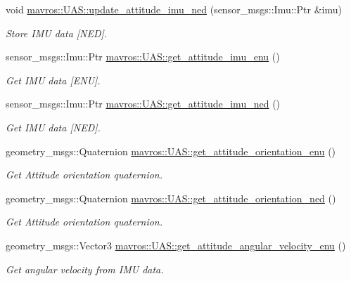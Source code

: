 \begin{DoxyCompactItemize}
void \mbox{\hyperlink{group__nodelib_gacd6fc1ac631a90619d7f53fa5ab9b29d}{mavros\+::\+U\+A\+S\+::update\+\_\+attitude\+\_\+imu\+\_\+ned}} (sensor\+\_\+msgs\+::\+Imu\+::\+Ptr \&imu)
\begin{DoxyCompactList}\small\item\em Store I\+MU data \mbox{[}N\+ED\mbox{]}. \end{DoxyCompactList}\item 
sensor\+\_\+msgs\+::\+Imu\+::\+Ptr \mbox{\hyperlink{group__nodelib_ga191709b6e50268022d10e469a3897975}{mavros\+::\+U\+A\+S\+::get\+\_\+attitude\+\_\+imu\+\_\+enu}} ()
\begin{DoxyCompactList}\small\item\em Get I\+MU data \mbox{[}E\+NU\mbox{]}. \end{DoxyCompactList}\item 
sensor\+\_\+msgs\+::\+Imu\+::\+Ptr \mbox{\hyperlink{group__nodelib_ga31440655ed2c55b927fb6e3ed66a41a1}{mavros\+::\+U\+A\+S\+::get\+\_\+attitude\+\_\+imu\+\_\+ned}} ()
\begin{DoxyCompactList}\small\item\em Get I\+MU data \mbox{[}N\+ED\mbox{]}. \end{DoxyCompactList}\item 
geometry\+\_\+msgs\+::\+Quaternion \mbox{\hyperlink{group__nodelib_gada6bb75eadc7ce6ad379c5e3a24625b0}{mavros\+::\+U\+A\+S\+::get\+\_\+attitude\+\_\+orientation\+\_\+enu}} ()
\begin{DoxyCompactList}\small\item\em Get Attitude orientation quaternion. \end{DoxyCompactList}\item 
geometry\+\_\+msgs\+::\+Quaternion \mbox{\hyperlink{group__nodelib_ga7524149188b866dfd044b2d6e03eb328}{mavros\+::\+U\+A\+S\+::get\+\_\+attitude\+\_\+orientation\+\_\+ned}} ()
\begin{DoxyCompactList}\small\item\em Get Attitude orientation quaternion. \end{DoxyCompactList}\item 
geometry\+\_\+msgs\+::\+Vector3 \mbox{\hyperlink{group__nodelib_ga2386d8414c90fcd1d19832656eed1742}{mavros\+::\+U\+A\+S\+::get\+\_\+attitude\+\_\+angular\+\_\+velocity\+\_\+enu}} ()
\begin{DoxyCompactList}\small\item\em Get angular velocity from I\+MU data. \end{DoxyCompactList}\item 

\end{DoxyCompactItemize}
